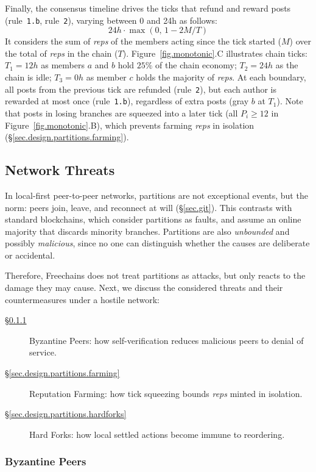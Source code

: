\documentclass[10pt,twocolumn]{article}
\newcommand{\FC}       {Freechains\xspace}
\newcommand{\R}[1]     {rule~\code{#1}\xspace}
\newcommand{\reps}     {\emph{reps}\xspace}
\newcommand{\code}[1]  {\texttt{\small{#1}}}
\begin{document}
Finally, the consensus timeline drives the ticks that refund and reward posts
(\R{1.b}, \R{2}), varying between 0 and 24h as follows:
\[
    24h \cdot \max(0,\, 1 - 2M/T)
\]
It considers the sum of \reps of the members acting since the tick started
($M$) over the total of \reps in the chain ($T$).
%
Figure~\ref{fig.monotonic}.C illustrates chain ticks:
    $T_1=12h$ as members $a$ and $b$ hold $25\%$ of the chain economy;
    $T_2=24h$ as the chain is idle;
    $T_3=0h$ as member $c$ holds the majority of \reps.
%
At each boundary, all posts from the previous tick are refunded (\R{2}), but
each author is rewarded at most once (\R{1.b}), regardless of extra posts
(gray $b$ at $T_1$).
%
Note that posts in losing branches are squeezed into a later tick (all
$P_i \geq 12$ in Figure~\ref{fig.monotonic}.B), which prevents farming \reps in
isolation (\S\ref{sec.design.partitions.farming}).

\subsection{Network Threats}
\label{sec.design.partitions}

In local-first peer-to-peer networks, partitions are not exceptional events,
but the norm:
    peers join, leave, and reconnect at will (\S\ref{sec.git}).
%
This contrasts with standard blockchains, which consider partitions as faults,
and assume an online majority that discards minority branches.
%
Partitions are also \emph{unbounded} and possibly \emph{malicious}, since no
one can distinguish whether the causes are deliberate or accidental.

Therefore, \FC does not treat partitions as attacks, but only reacts to the
damage they may cause.
Next, we discuss the considered threats and their countermeasures under a
hostile network:
%
\begin{description}
\item [\S\ref{sec.design.byz}]
    Byzantine Peers:
    how self-verification reduces malicious peers to denial of service.
\item [\S\ref{sec.design.partitions.farming}]
    Reputation Farming:
    how tick squeezing bounds \reps minted in isolation.
\item [\S\ref{sec.design.partitions.hardforks}]
    Hard Forks:
    how local settled actions become immune to reordering.
\end{description}

\subsubsection{Byzantine Peers}
\label{sec.design.byz}
\end{document}
